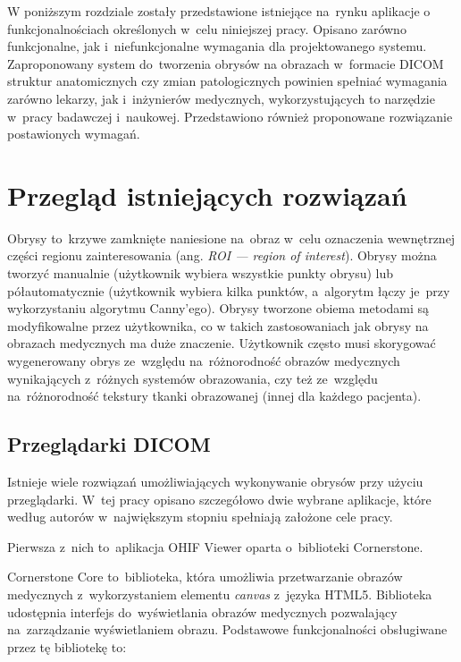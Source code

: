 \documentclass[a4paper,11pt,twoside,openright]{report}
\theoremstyle{definition}
\begin{document}
W poniższym rozdziale zostały przedstawione istniejące na~rynku aplikacje o
funkcjonalnościach określonych w~celu niniejszej pracy. Opisano zarówno funkcjonalne, jak i~niefunkcjonalne
wymagania dla projektowanego systemu. Zaproponowany system do~tworzenia obrysów
na obrazach w~formacie DICOM struktur anatomicznych czy zmian patologicznych
powinien spełniać wymagania zarówno lekarzy, jak i~inżynierów medycznych, wykorzystujących
to narzędzie w~pracy badawczej i~naukowej. Przedstawiono również proponowane rozwiązanie
postawionych wymagań.

\section {Przegląd istniejących rozwiązań}

Obrysy to~krzywe zamknięte naniesione na~obraz w~celu oznaczenia wewnętrznej części
regionu zainteresowania (ang. \textit{ROI --- region of interest}).
Obrysy można tworzyć manualnie (użytkownik wybiera wszystkie punkty obrysu) lub
półautomatycznie (użytkownik wybiera kilka punktów, a~algorytm łączy je~przy wykorzystaniu
algorytmu Canny'ego). Obrysy tworzone obiema metodami są modyfikowalne przez użytkownika,
co w takich zastosowaniach jak obrysy na obrazach medycznych ma duże znaczenie. Użytkownik często musi skorygować
wygenerowany obrys ze~względu na~różnorodność obrazów medycznych wynikających z~różnych systemów
obrazowania, czy też ze~względu na~różnorodność tekstury tkanki obrazowanej (innej dla każdego pacjenta).

\subsection {Przeglądarki DICOM}

Istnieje wiele rozwiązań umożliwiających wykonywanie obrysów przy użyciu przeglądarki.
W~tej pracy opisano szczegółowo dwie wybrane aplikacje, które według autorów w~największym
stopniu spełniają założone cele pracy.

Pierwsza z~nich to~aplikacja OHIF Viewer \cite{OHIF Viewer} oparta o~biblioteki Cornerstone.

Cornerstone Core \cite{Cornerstone Core} to~biblioteka, która umożliwia przetwarzanie
obrazów medycznych z~wykorzystaniem elementu \textit{canvas} z~języka HTML5. Biblioteka
udostępnia interfejs do~wyświetlania obrazów medycznych pozwalający na~zarządzanie
wyświetlaniem obrazu. Podstawowe funkcjonalności obsługiwane przez tę bibliotekę to:
\end{document}

